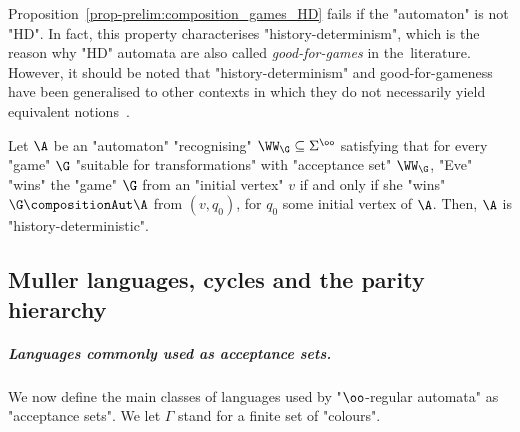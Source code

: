 \documentclass{theoretics}
\begin{document}
Proposition~\ref{prop-prelim:composition_games_HD} fails if the "automaton" is not "HD". In fact, this property characterises "history-determinism", which is the reason why "HD" automata are also called \emph{good-for-games} in the~literature. However, it should be noted that "history-determinism" and good-for-gameness have been generalised to other contexts in which they do not necessarily yield equivalent notions~\cite{BL21HDvsGFG,Colcombet2009CostFunctions}.

\begin{proposition}[\cite{HP06}]\label{prop:HD-iff-GFG}
	Let $\A$ be an "automaton" "recognising" $\WW_{\G}\subseteq \Sigma^\oo$ satisfying that for every "game" $\G$ "suitable for transformations"  with "acceptance set" $\WW_\G$, "Eve" "wins" the "game" $\G$ from an "initial vertex" $v$ if and only if she "wins" $\G \compositionAut \A$ from $(v,q_0)$, for $q_0$  some initial vertex of $\A$. Then, $\A$ is "history-deterministic".
\end{proposition}

\subsection{Muller languages, cycles and the parity hierarchy}\label{subsect-prelim:acceptance-conditions}

\subparagraph{Languages commonly used as acceptance sets.}
We now define the main classes of languages used by "$\oo$-regular automata" as "acceptance sets".
We let $\Gamma$ stand for a finite set of "colours".
\end{document}
